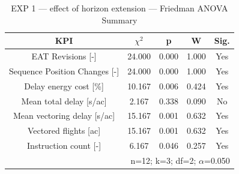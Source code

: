 \begin{table}[!t]
\caption{EXP 1 — effect of horizon extension — Friedman ANOVA Summary}
\begin{center}
\footnotesize
\setlength{\tabcolsep}{3pt}
\renewcommand{\arraystretch}{1.000}
\begin{tabular}{|c|c|c|c|c|}
\hline
\textbf{KPI} & \textbf{$\chi^2$} & \textbf{p} & \textbf{W} & \textbf{Sig.} \\
\hline
EAT Revisions [-] & 24.000 & 0.000 & 1.000 & Yes \\
\hline
Sequence Position Changes [-] & 24.000 & 0.000 & 1.000 & Yes \\
\hline
Delay energy cost [\%] & 10.167 & 0.006 & 0.424 & Yes \\
\hline
Mean total delay [s/ac] & 2.167 & 0.338 & 0.090 & No \\
\hline
Mean vectoring delay [s/ac] & 15.167 & 0.001 & 0.632 & Yes \\
\hline
Vectored flights [ac] & 15.167 & 0.001 & 0.632 & Yes \\
\hline
Instruction count [-] & 6.167 & 0.046 & 0.257 & Yes \\
\hline
\multicolumn{5}{r}{n=12; k=3; df=2; $\alpha$=0.050}\\
\end{tabular}
\label{tab:exp\_1\_effect\_of\_horizon\_extension\_friedman}
\end{center}
\end{table}